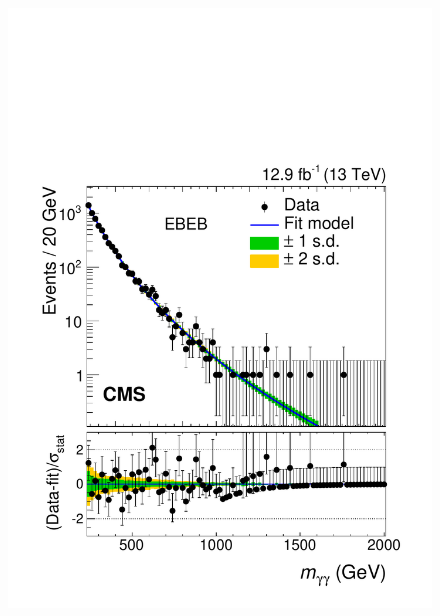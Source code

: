 \begin{figure}[bthp]
    \centering
    \includegraphics[width=\cmsFigWidth]{Figure_001-a.pdf}

\end{figure}
